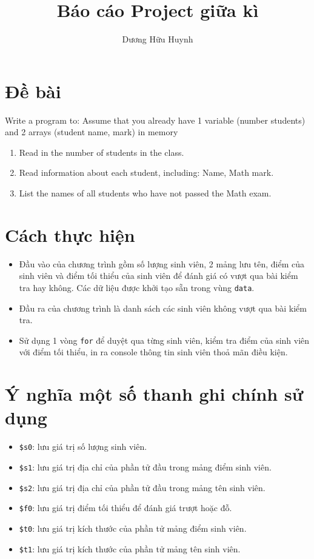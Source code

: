 \documentclass{article}
\title{Báo cáo Project giữa kì}
\author{Dương Hữu Huynh}
\begin{document}
\maketitle
\section{Đề bài}
Write a program to:
Assume that you already have 1 variable (number students) and 2 arrays (student name, mark) in memory
\begin{enumerate}
    \item Read in the number of students in the class.
    \item Read information about each student, including: Name, Math mark.
    \item List the names of all students who have not passed the Math exam.
\end{enumerate}
\section{Cách thực hiện}
\begin{itemize}
    \item Đầu vào của chương trình gồm số lượng sinh viên, 2 mảng lưu tên, điểm của sinh viên và điểm tối thiểu của sinh viên để đánh giá có vượt qua bài kiểm tra hay không. Các dữ liệu được khởi tạo sẵn trong vùng \verb|data|. 
    \item Đầu ra của chương trình là danh sách các sinh viên không vượt qua bài kiểm tra.
    \item Sử dụng 1 vòng \verb|for| để duyệt qua từng sinh viên, kiểm tra điểm của sinh viên với điểm tối thiểu, in ra console thông tin sinh viên thoả mãn điều kiện.
\end{itemize}
\section{Ý nghĩa một số thanh ghi chính sử dụng}
\begin{itemize}
    \item \verb|$s0|: lưu giá trị số lượng sinh viên.
    \item \verb|$s1|: lưu giá trị địa chỉ của phần tử đầu trong mảng điểm sinh viên.
    \item \verb|$s2|: lưu giá trị địa chỉ của phần tử đầu trong mảng tên sinh viên.
    \item \verb|$f0|: lưu giá trị điểm tối thiểu để đánh giá trượt hoặc đỗ.
    \item \verb|$t0|: lưu giá trị kích thước của phần tử mảng điểm sinh viên.
    \item \verb|$t1|: lưu giá trị kích thước của phần tử mảng tên sinh viên.
\end{itemize}
\end{document}
